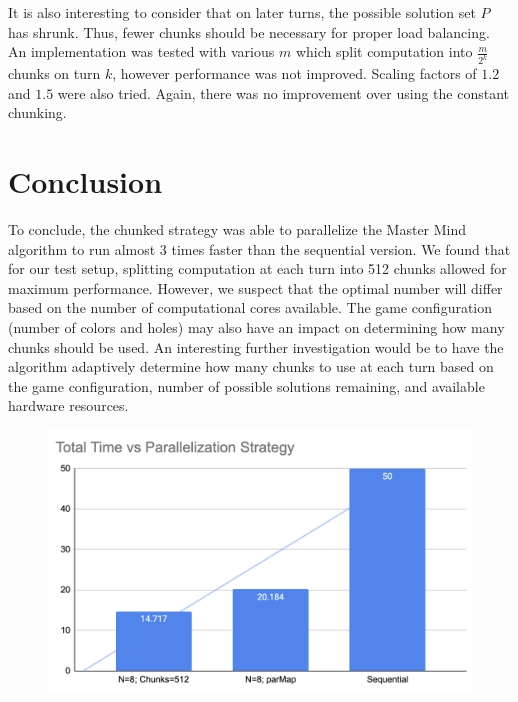 \documentclass{article}
\begin{document}
It is also interesting to consider that on later turns, the possible solution set $P$ has shrunk. Thus, fewer chunks should be necessary for proper load balancing. An implementation was tested with various $m$ which split computation into $\frac{m}{2^k}$ chunks on turn $k$, however performance was not improved. Scaling factors of $1.2$ and $1.5$ were also tried. Again, there was no improvement over using the constant chunking.


\section{Conclusion}
To conclude, the chunked strategy was able to parallelize the Master Mind algorithm to run almost 3 times faster than the sequential version. We found that for our test setup, splitting computation at each turn into 512 chunks allowed for maximum performance. However, we suspect that the optimal number will differ based on the number of computational cores available. The game configuration (number of colors and holes) may also have an impact on determining how many chunks should be used. An interesting further investigation would be to have the algorithm adaptively determine how many chunks to use at each turn based on the game configuration, number of possible solutions remaining, and available hardware resources.

\begin{figure}[H]
	\centering
	\includegraphics[width=40em]{../images/bar_sum.png}
\end{figure}
\end{document}
